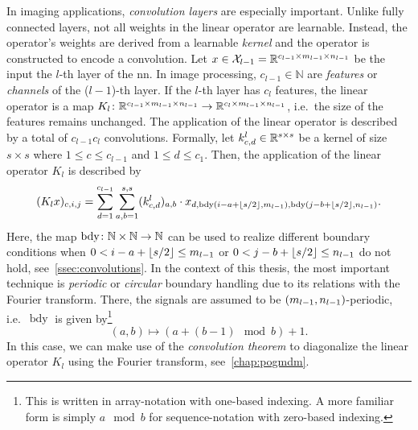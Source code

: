 In imaging applications, \emph{convolution layers} are especially important.
Unlike fully connected layers, not all weights in the linear operator are learnable.
Instead, the operator's weights are derived from a learnable \emph{kernel} and the operator is constructed to encode a convolution.
Let \( x \in \mathcal{X}_{l-\num{1}} = \mathbb{R}^{c_{l-\num{1}} \times m_{l-\num{1}} \times n_{l-\num{1}}} \) be the input the \( l \)-th layer of the \gls{nn}.
In image processing, \( c_{l-\num{1}} \in \mathbb{N} \) are \emph{features} or \emph{channels} of the (\( l - \num{1} \))-th layer.
If the \( l \)-th layer has \( c_l \) features, the linear operator is a map \( K_l \colon \mathbb{R}^{c_{l-\num{1}} \times m_{l-\num{1}} \times n_{l-\num{1}}} \to \mathbb{R}^{c_{l} \times m_{l-\num{1}} \times n_{l-\num{1}}} \), i.e.\ the size of the features remains unchanged.
The application of the linear operator is described by a total of \( c_{l-\num{1}} c_l\) convolutions.
Formally, let \( k^l_{c, d} \in \mathbb{R}^{s \times s} \) be a kernel of size \( s \times s \) where \( \num{1} \leq c \leq c_{l-\num{1}} \) and \( \num{1} \leq d \leq c_{\num{1}} \).
Then, the application of the linear operator \( K_l \) is described by
\begin{equation}
	(K_l x)_{c, i, j} = \sum_{d=\num{1}}^{c_{l-\num{1}}} \sum_{a,b=\num{1}}^{s,s} (k^l_{c, d})_{a, b} \cdot x_{d, \operatorname{bdy}(i - a + \lfloor s / \num{2} \rfloor, m_{l-1}), \operatorname{bdy}(j - b + \lfloor s / \num{2} \rfloor, n_{l-\num{1}})}.
\end{equation}
Here, the map \( \operatorname{bdy} \colon \mathbb{N} \times \mathbb{N} \to \mathbb{N} \) can be used to realize different boundary conditions when \( \num{0} < i - a + \lfloor s / \num{2} \rfloor \leq m_{l-\num{1}} \) or \( \num{0} < j - b + \lfloor s / \num{2} \rfloor \leq n_{l-\num{1}} \) do not hold, see~\cref{ssec:convolutions}.
In the context of this thesis, the most important technique is \emph{periodic} or \emph{circular} boundary handling due to its relations with the Fourier transform.
There, the signals are assumed to be \( (m_{l-\num{1}}, n_{l-\num{1}}) \)-periodic, i.e.\ \( \operatorname{bdy} \) is given by\footnote{%
	This is written in array-notation with one-based indexing.
	A more familiar form is simply \( a \mod b \) for sequence-notation with zero-based indexing.
}
\begin{equation}
	(a, b) \mapsto (a + (b - \num{1}) \mod b) + \num{1}.
\end{equation}
In this case, we can make use of the \emph{convolution theorem} to diagonalize the linear operator \( K_l \) using the Fourier transform, see~\cref{chap:pogmdm}.

